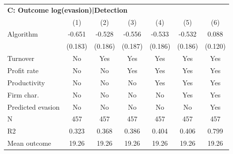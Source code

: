 \begin{tabular}{lcccccc}
\midrule \multicolumn{7}{l}{\textbf{C: Outcome log(evasion)|Detection}} \\ \multicolumn{1}{l}{} & (1) & (2) & (3) & (4) & (5) & (6) \\ \midrule
Algorithm   &      -0.651\sym{***}&      -0.528\sym{***}&      -0.556\sym{***}&      -0.533\sym{***}&      -0.532\sym{***}&       0.088         \\
            &     (0.183)         &     (0.186)         &     (0.187)         &     (0.186)         &     (0.186)         &     (0.120)         \\
\midrule
Turnover    &          No         &         Yes         &         Yes         &         Yes         &         Yes         &         Yes         \\
Profit rate &          No         &          No         &         Yes         &         Yes         &         Yes         &         Yes         \\
Productivity&          No         &          No         &          No         &         Yes         &         Yes         &         Yes         \\
Firm char.  &          No         &          No         &          No         &          No         &         Yes         &         Yes         \\
Predicted evasion&          No         &          No         &          No         &          No         &          No         &         Yes         \\
N           &         457         &         457         &         457         &         457         &         457         &         457         \\
R2          &       0.323         &       0.368         &       0.386         &       0.404         &       0.406         &       0.799         \\
Mean outcome&       19.26         &       19.26         &       19.26         &       19.26         &       19.26         &       19.26         \\
\bottomrule \end{tabular}
